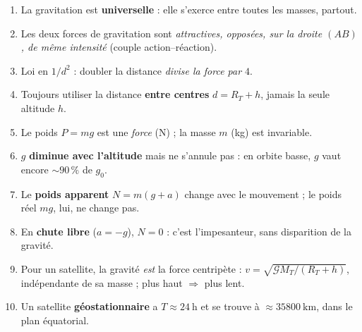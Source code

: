 \documentclass[11pt,a4paper]{article}
\newcommand{\Grav}{\mathcal{G}}        %
\begin{document}
\begin{enumerate}[leftmargin=2em,topsep=3pt,itemsep=3pt]
  \item La gravitation est \textbf{universelle} : elle s'exerce entre toutes les masses,
        partout.
  \item Les deux forces de gravitation sont \emph{attractives, opposées, sur la droite
        $(AB)$, de même intensité} (couple action--réaction).
  \item Loi en $1/d^2$ : doubler la distance \emph{divise la force par $4$}.
  \item Toujours utiliser la distance \textbf{entre centres} $d=R_T+h$, jamais la seule
        altitude $h$.
  \item Le poids $P=mg$ est une \emph{force} (\si{\newton}) ; la masse $m$ (\si{\kilogram})
        est invariable.
  \item $g$ \textbf{diminue avec l'altitude} mais ne s'annule pas : en orbite basse,
        $g$ vaut encore $\sim 90\,\%$ de $g_0$.
  \item Le \textbf{poids apparent} $N=m(g+a)$ change avec le mouvement ; le poids réel
        $mg$, lui, ne change pas.
  \item En \textbf{chute libre} ($a=-g$), $N=0$ : c'est l'impesanteur, sans disparition
        de la gravité.
  \item Pour un satellite, la gravité \emph{est} la force centripète :
        $v=\sqrt{\Grav M_T/(R_T+h)}$, indépendante de sa masse ; plus haut $\Rightarrow$
        plus lent.
  \item Un satellite \textbf{géostationnaire} a $T\approx\SI{24}{\hour}$ et se trouve à
        $\approx\SI{35800}{\kilo\metre}$, dans le plan équatorial.
\end{enumerate}

\vfill
\begin{center}
\end{center}
\end{document}

